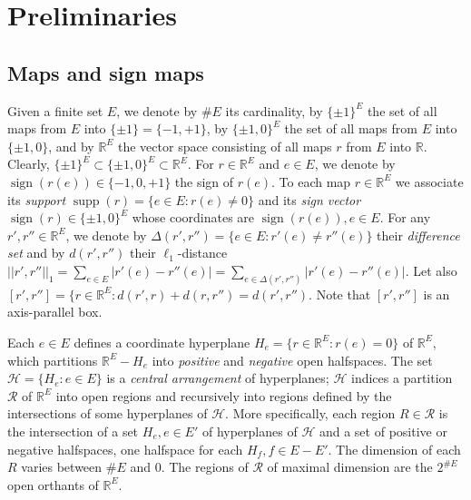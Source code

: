 \documentclass[11pt,a4paper]{amsart}
\theoremstyle{definition}
\numberwithin{equation}{section}
\DeclareMathOperator{\supp}{supp}
\DeclareMathOperator{\sign}{sign}
\begin{document}
\section{Preliminaries} \label{preliminaries}

\subsection{Maps and sign maps} Given a finite set $E$, we denote by $\#E$ its cardinality,
by $\{ \pm 1\}^E$  the set  of all maps from  $E$
into  $\{ \pm 1\}=\{ -1,+1\}$, by $\{ \pm 1,0\}^E$  the set  of all maps from  $E$
into  $\{ \pm 1,0\}$, and by ${\mathbb R}^E$ the vector space consisting of all maps $r$
from $E$ into $\mathbb R$. Clearly, $\{ \pm 1\}^E\subset \{ \pm 1,0\}^E\subset {\mathbb R}^E$.
For $r \in {\mathbb R}^E$ and $e\in E$, we denote by $\sign(r(e))\in \{ -1,0,+1\}$ the sign of $r(e)$.
To each map $r\in {\mathbb R}^E$ we associate its \emph{support} $\supp(r)=\{ e\in E: r(e)\ne 0\}$ and its  \emph{sign vector} $\sign(r)\in \{ \pm 1, 0\}^E$ whose coordinates are $\sign(r(e)), e\in E$.
For any $r',r''\in {\mathbb R}^E$, we denote by $\Delta(r',r'')=\{ e\in E: r'(e)\ne r''(e)\}$ their \emph{difference set} and by
$d(r',r'')$ their $\ell_1$-distance $||r',r''||_1=\sum_{e\in E} |r'(e)-r''(e)|=\sum_{e\in \Delta(r',r'')} |r'(e)-r''(e)|$. Let also $[r',r'']=\{ r\in {\mathbb R}^E: d(r',r)+d(r,r'')=d(r',r'')$. Note that $[r',r'']$ is an axis-parallel box.


Each  $e\in E$ defines a coordinate hyperplane $H_e=\{ r\in {\mathbb R}^E: r(e)=0\}$ of ${\mathbb R}^E$, which partitions ${\mathbb R}^E-H_e$ into \emph{positive} and \emph{negative} open halfspaces.   The set ${\mathcal H}=\{ H_e: e\in E\}$ is a \emph{central arrangement} of hyperplanes; ${\mathcal H}$  indices a partition ${\mathcal R}$ of ${\mathbb R}^E$ into open regions and recursively into regions defined by  the intersections of some  hyperplanes of ${\mathcal H}$. More specifically, each region $R\in \mathcal R$ is the intersection of a set $H_e, e\in E'$ of  hyperplanes of ${\mathcal H}$ and a set of positive or negative halfspaces, one halfspace for each  $H_f, f\in E-E'$.  The dimension of each $R$ varies between  $\#E$ and $0$. The regions of $\mathcal R$ of maximal dimension are the $2^{\# E}$ open orthants of ${\mathbb R}^E$.
\end{document}
